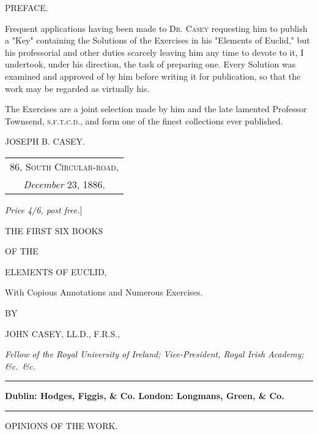 \documentclass[oneside]{book}
\begin{document}
\newpage
\begin{center}
{\LARGE PREFACE.}
\end{center}


Frequent applications having been made to \textsc{Dr. Casey}
requesting him to publish a "Key" containing the
Solutions of the Exercises in his "Elements of Euclid,"
but his professorial and other duties scarcely leaving
him any time to devote to it, I undertook, under his
direction, the task of preparing one. Every Solution
was examined and approved of by him before writing
it for publication, so that the work may be regarded
as virtually his.

The Exercises are a joint selection made by him and
the late lamented Professor Townsend, \textsc{s.f.t.c.d.}, and
form one of the finest collections ever published.

\bigskip

\begin{flushright}
JOSEPH B. CASEY. \mbox\quad
\end{flushright}
\bigskip

\noindent
\begin{tabular}{@{}c@{}}
\textsc{86, South Circular-road,}\\
\textit{December} 23, 1886.
\end{tabular}




\newpage
\noindent
\textit{\textsf{Price 4/6, post free.}}]

\bigskip
\begin{center}
THE FIRST SIX BOOKS

\medskip
{\tiny OF THE}

\bigskip
\textsf{\LARGE ELEMENTS OF EUCLID,}

\medskip
With Copious Annotations and Numerous Exercises.
\bigskip

{\footnotesize BY}

\bigskip
{\Large JOHN CASEY, LL\@.D., F.R.S.,}

\medskip
\textit{\textsf{Fellow of the Royal University of Ireland; Vice-President, Royal
Irish Academy; \&c.\ \&c.}}

\bigskip
\rule[1ex]{3cm}{1pt}

\textbf{Dublin: Hodges, Figgis, \& Co.\quad
London: Longmans, Green, \& Co.}

\medskip
\rule[1ex]{3cm}{1pt}
\bigskip

\textsf{\Large OPINIONS OF THE WORK.}
\end{center}
\end{document}
